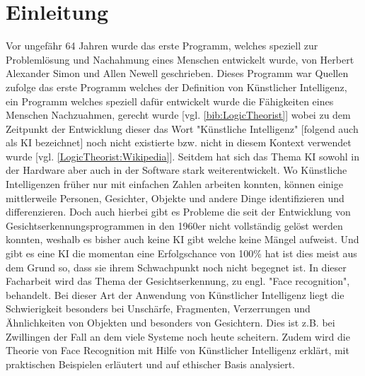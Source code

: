 \section{Einleitung}
\label{sec:einleitung}
Vor ungefähr 64 Jahren wurde das erste Programm, welches speziell zur Problemlösung und Nachahmung eines Menschen entwickelt wurde, von Herbert Alexander Simon und Allen Newell geschrieben. Dieses Programm war Quellen zufolge das erste Programm welches der Definition von Künstlicher Intelligenz, ein Programm welches speziell dafür entwickelt wurde die Fähigkeiten eines Menschen Nachzuahmen, gerecht wurde [vgl. \ref{bib:LogicTheorist}] wobei zu dem Zeitpunkt der Entwicklung dieser das Wort "Künstliche Intelligenz" [folgend auch als KI bezeichnet] noch nicht existierte bzw. nicht in diesem Kontext verwendet wurde [vgl. \ref{LogicTheorist:Wikipedia}]. Seitdem hat sich das Thema KI sowohl in der Hardware aber auch in der Software stark weiterentwickelt. Wo Künstliche Intelligenzen früher nur mit einfachen Zahlen arbeiten konnten, können einige mittlerweile Personen, Gesichter, Objekte und andere Dinge identifizieren und differenzieren. Doch auch hierbei gibt es Probleme die seit der Entwicklung von Gesichtserkennungsprogrammen in den 1960er nicht vollständig gelöst werden konnten, weshalb es bisher auch keine KI gibt welche keine Mängel aufweist. Und gibt es eine KI die momentan eine Erfolgschance von 100\% hat ist dies meist aus dem Grund so, dass sie ihrem Schwachpunkt noch nicht begegnet ist. In dieser Facharbeit wird das Thema der Gesichtserkennung, zu engl. "Face recognition", behandelt. Bei dieser Art der Anwendung von Künstlicher Intelligenz liegt die Schwierigkeit besonders bei Unschärfe, Fragmenten, Verzerrungen und Ähnlichkeiten von Objekten und besonders von Gesichtern. Dies ist z.B. bei Zwillingen der Fall an dem viele Systeme noch heute scheitern. Zudem wird die Theorie von Face Recognition mit Hilfe von Künstlicher Intelligenz erklärt, mit praktischen Beispielen erläutert und auf ethischer Basis analysiert.